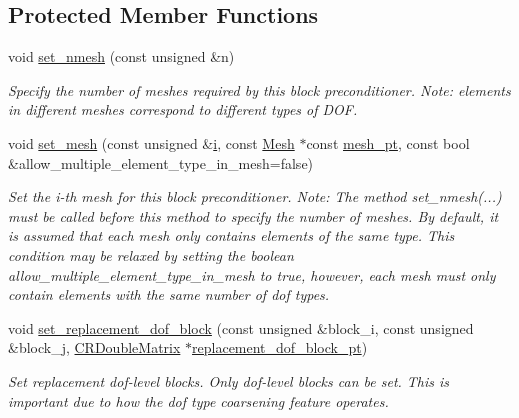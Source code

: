 \subsection*{Protected Member Functions}
\begin{DoxyCompactItemize}
\item 
void \hyperlink{classoomph_1_1BlockPreconditioner_ae055f998f6145656352aacac22e545ad}{set\+\_\+nmesh} (const unsigned \&n)
\begin{DoxyCompactList}\small\item\em Specify the number of meshes required by this block preconditioner. Note\+: elements in different meshes correspond to different types of D\+OF. \end{DoxyCompactList}\item 
void \hyperlink{classoomph_1_1BlockPreconditioner_af97821621b570d409e6662939e5f818d}{set\+\_\+mesh} (const unsigned \&\hyperlink{cfortran_8h_adb50e893b86b3e55e751a42eab3cba82}{i}, const \hyperlink{classoomph_1_1Mesh}{Mesh} $\ast$const \hyperlink{classoomph_1_1BlockPreconditioner_a3c0e92cb77c3e3179007fe9fd99b6428}{mesh\+\_\+pt}, const bool \&allow\+\_\+multiple\+\_\+element\+\_\+type\+\_\+in\+\_\+mesh=false)
\begin{DoxyCompactList}\small\item\em Set the i-\/th mesh for this block preconditioner. Note\+: The method set\+\_\+nmesh(...) must be called before this method to specify the number of meshes. By default, it is assumed that each mesh only contains elements of the same type. This condition may be relaxed by setting the boolean allow\+\_\+multiple\+\_\+element\+\_\+type\+\_\+in\+\_\+mesh to true, however, each mesh must only contain elements with the same number of dof types. \end{DoxyCompactList}\item 
void \hyperlink{classoomph_1_1BlockPreconditioner_a8a0ae880f098d5b1e9df78fc74c31dbf}{set\+\_\+replacement\+\_\+dof\+\_\+block} (const unsigned \&block\+\_\+i, const unsigned \&block\+\_\+j, \hyperlink{classoomph_1_1CRDoubleMatrix}{C\+R\+Double\+Matrix} $\ast$\hyperlink{classoomph_1_1BlockPreconditioner_ac8ef0e69b712d9ab7902d277a14ed8f5}{replacement\+\_\+dof\+\_\+block\+\_\+pt})
\begin{DoxyCompactList}\small\item\em Set replacement dof-\/level blocks. Only dof-\/level blocks can be set. This is important due to how the dof type coarsening feature operates. \end{DoxyCompactList}\item 

\end{DoxyCompactItemize}
